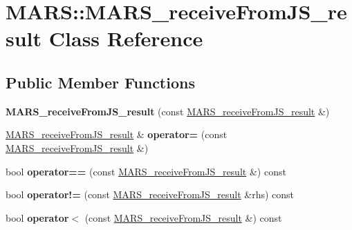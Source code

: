 \hypertarget{classMARS_1_1MARS__receiveFromJS__result}{}\section{M\+A\+RS\+:\+:M\+A\+R\+S\+\_\+receive\+From\+J\+S\+\_\+result Class Reference}
\label{classMARS_1_1MARS__receiveFromJS__result}
\subsection*{Public Member Functions}
\begin{DoxyCompactItemize}
\item 
\mbox{\label{classMARS_1_1MARS__receiveFromJS__result_a148375389491c2b8c37e907ecad1d73a}} 
{\bfseries M\+A\+R\+S\+\_\+receive\+From\+J\+S\+\_\+result} (const \hyperlink{classMARS_1_1MARS__receiveFromJS__result}{M\+A\+R\+S\+\_\+receive\+From\+J\+S\+\_\+result} \&)
\item 
\mbox{\label{classMARS_1_1MARS__receiveFromJS__result_a65d5f4b055c9c71069f8e3316f169d9d}} 
\hyperlink{classMARS_1_1MARS__receiveFromJS__result}{M\+A\+R\+S\+\_\+receive\+From\+J\+S\+\_\+result} \& {\bfseries operator=} (const \hyperlink{classMARS_1_1MARS__receiveFromJS__result}{M\+A\+R\+S\+\_\+receive\+From\+J\+S\+\_\+result} \&)
\item 
\mbox{\label{classMARS_1_1MARS__receiveFromJS__result_ab9ea7caa1a64ef9b0e7b6fccef280225}} 
bool {\bfseries operator==} (const \hyperlink{classMARS_1_1MARS__receiveFromJS__result}{M\+A\+R\+S\+\_\+receive\+From\+J\+S\+\_\+result} \&) const
\item 
\mbox{\label{classMARS_1_1MARS__receiveFromJS__result_a7d554e9ce1b1e03312c6f7c3076e96b5}} 
bool {\bfseries operator!=} (const \hyperlink{classMARS_1_1MARS__receiveFromJS__result}{M\+A\+R\+S\+\_\+receive\+From\+J\+S\+\_\+result} \&rhs) const
\item 
\mbox{\label{classMARS_1_1MARS__receiveFromJS__result_a8f33720486d15934dc7848f51af8f6d7}} 
bool {\bfseries operator$<$} (const \hyperlink{classMARS_1_1MARS__receiveFromJS__result}{M\+A\+R\+S\+\_\+receive\+From\+J\+S\+\_\+result} \&) const

\end{DoxyCompactItemize}
